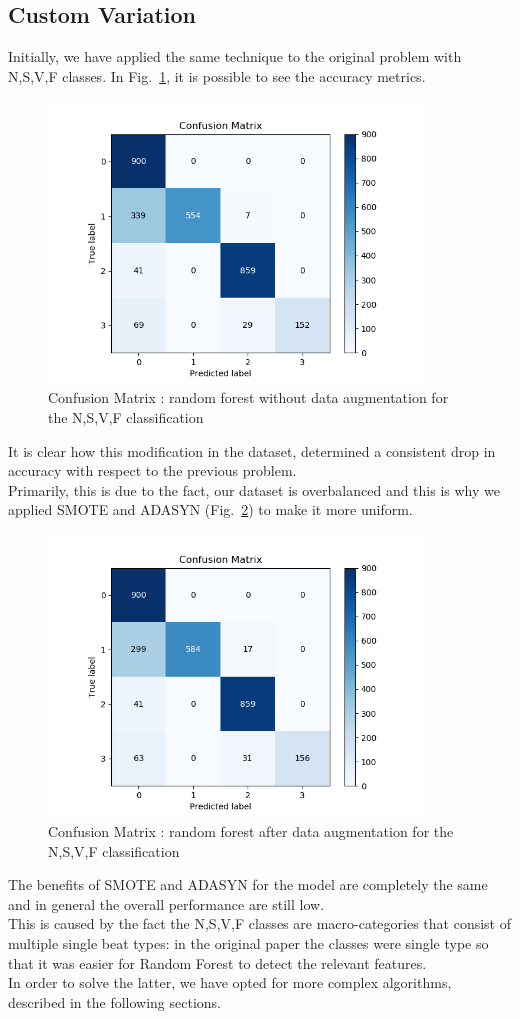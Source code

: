 \documentclass[LaM,binding=0.6cm]{sapthesis}
\begin{document}
\subsection{Custom Variation}
Initially, we have applied the same technique to the original problem with N,S,V,F classes. In Fig.~\ref{fig:rf3}, it is possible to see the accuracy metrics.
\begin{figure}[H]  \centering
	\includegraphics[width=100mm,scale=0.7]{random-forest-no-aug.png}
	\caption{Confusion Matrix : random forest without data augmentation for the N,S,V,F classification}
	\label{fig:rf3}
\end{figure}
It is clear how this modification in the dataset, determined a consistent drop in accuracy with respect to the previous problem.\\Primarily, this is due to the fact, our dataset is overbalanced and this is why we applied SMOTE and ADASYN (Fig.~\ref{fig:rf4}) to make it more uniform.
\begin{figure}[H]  \centering
	\includegraphics[width=100mm,scale=0.7]{random-forest-smote.png}
	\caption{Confusion Matrix : random forest after data augmentation for the N,S,V,F classification}
	\label{fig:rf4}
\end{figure}
The benefits of SMOTE and ADASYN for the model are completely the same and in general the overall performance are still low.\\This is caused by the fact the N,S,V,F classes are macro-categories that consist of multiple single beat types: in the original paper the classes were single type so that it was easier for Random Forest to detect the relevant features.\\In order to solve the latter, we have opted for more complex algorithms, described in the following sections.
\end{document}
